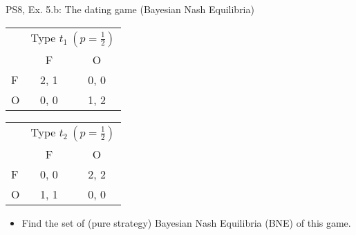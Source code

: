 \begin{frame}{PS8, Ex. 5.b: The dating game (Bayesian Nash Equilibria)}
    \begin{table}
      \begin{tabular}{l|c|c|}
        \multicolumn{1}{c}{} & \multicolumn{2}{c}{Type $t_1\ (p=\frac{1}{2})$} \\
        \multicolumn{1}{c}{} & \multicolumn{1}{c}{F} & \multicolumn{1}{c}{O} \\\cline{2-3}
        F & 2, 1 & 0, 0 \\\cline{2-3}
        O & 0, 0 & 1, 2 \\\cline{2-3}
      \end{tabular}\quad\quad
      \begin{tabular}{l|c|c|}
        \multicolumn{1}{c}{} & \multicolumn{2}{c}{Type $t_2\ (p=\frac{1}{2})$} \\
        \multicolumn{1}{c}{} & \multicolumn{1}{c}{F} & \multicolumn{1}{c}{O} \\\cline{2-3}
        F & 0, 0 & 2, 2 \\\cline{2-3}
        O & 1, 1 & 0, 0 \\\cline{2-3}
      \end{tabular}
    \end{table}
    \begin{itemize}
      \item[(b)] Find the set of (pure strategy) Bayesian Nash Equilibria (BNE) of this game.
    \end{itemize}
    \vfill\null
\end{frame}
